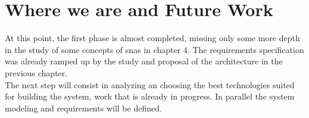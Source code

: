 \section{Where we are and Future Work}

At this point, the first phase is almost completed, missing only some more depth in the study of some concepts of \glspl{sna} in chapter 4. The requirements specification was already ramped up by the study and proposal of the architecture in the previous chapter.\\
\indent The next step will consist in analyzing an choosing the best technologies suited for building the system, work that is already in progress. In parallel the system modeling and requirements will be defined.
